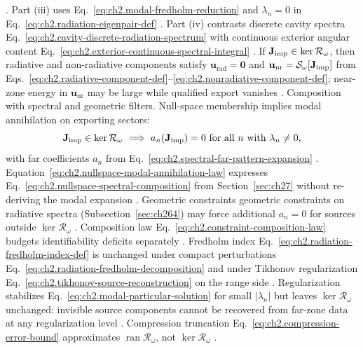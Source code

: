 \cite{harrington2001}. Part (iii) uses Eq.~\eqref{eq:ch2.modal-fredholm-reduction} and
\(\lambda_n=0\) in Eq.~\eqref{eq:ch2.radiation-eigenpair-def} \cite{stratton1941}. Part (iv)
contrasts discrete cavity spectra Eq.~\eqref{eq:ch2.cavity-discrete-radiation-spectrum} with
continuous exterior angular content Eq.~\eqref{eq:ch2.exterior-continuous-spectral-integral}
\cite{jackson1999}.
\label{prop:ch2.null-kernel-field-image}
If \(\mathbf{J}_{\mathrm{imp}}\in\ker\mathcal{R}_\omega\), then radiative and non-radiative components satisfy
\(\mathbf{u}_{\mathrm{rad}}=\mathbf{0}\) and
\(\mathbf{u}_{\mathrm{nr}}=\mathcal{S}_\omega[\mathbf{J}_{\mathrm{imp}}]\) from
Eqs.~\eqref{eq:ch2.radiative-component-def}--\eqref{eq:ch2.nonradiative-component-def};
near-zone energy in \(\mathbf{u}_{\mathrm{nr}}\) may be large while qualified export vanishes
\cite{stratton1941}.
Composition with spectral and geometric filters. Null-space membership implies modal annihilation on exporting sectors:
\label{eq:ch2.geometric-modal-annihilation}
\begin{equation}
\label{eq:ch2.nullspace-modal-annihilation-law}
\mathbf{J}_{\mathrm{imp}}\in\ker\mathcal{R}_\omega
\ \Longrightarrow\
a_n(\mathbf{J}_{\mathrm{imp}})=0
\ \text{for all}\ n\ \text{with}\ \lambda_n\neq 0,
\end{equation}
with far coefficients \(a_n\) from Eq.~\eqref{eq:ch2.spectral-far-pattern-expansion}
\cite{stratton1941}. Equation~\eqref{eq:ch2.nullspace-modal-annihilation-law}
expresses Eq.~\eqref{eq:ch2.nullspace-spectral-composition} from Section~\ref{sec:ch27} without
re-deriving the modal expansion \cite{stratton1941}. Geometric constraints
geometric constraints on radiative spectra (Subsection~\ref{sec:ch264}) may force additional \(a_n=0\) for sources
outside \(\ker\mathcal{R}_\omega\) \cite{harrington2001}. Composition law
Eq.~\eqref{eq:ch2.constraint-composition-law} budgets identifiability deficits separately
\cite{stratton1941}.
Fredholm index Eq.~\eqref{eq:ch2.radiation-fredholm-index-def} is unchanged under compact
perturbations Eq.~\eqref{eq:ch2.radiation-fredholm-decomposition} and under Tikhonov
regularization Eq.~\eqref{eq:ch2.tikhonov-source-reconstruction} on the range side
\cite{stratton1941}. Regularization stabilizes
Eq.~\eqref{eq:ch2.modal-particular-solution} for small \(|\lambda_n|\) but leaves
\(\ker\mathcal{R}_\omega\) unchanged: invisible source components cannot be recovered from
far-zone data at any regularization level \cite{stratton1941}. Compression truncation
Eq.~\eqref{eq:ch2.compression-error-bound} approximates \(\operatorname{ran}\mathcal{R}_\omega\),
not \(\ker\mathcal{R}_\omega\) \cite{harrington2001}.
